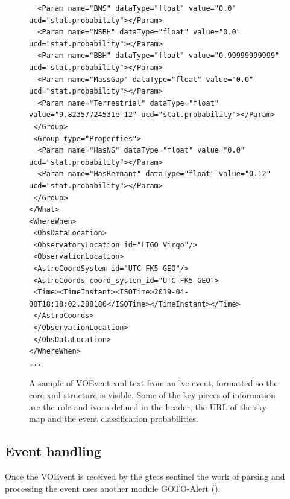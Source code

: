 \begin{colsection}
\begin{colsection}
\begin{figure}[p]
\begin{lstlisting}
  <Param name="BNS" dataType="float" value="0.0" ucd="stat.probability"></Param>
  <Param name="NSBH" dataType="float" value="0.0" ucd="stat.probability"></Param>
  <Param name="BBH" dataType="float" value="0.99999999999" ucd="stat.probability"></Param>
  <Param name="MassGap" dataType="float" value="0.0" ucd="stat.probability"></Param>
  <Param name="Terrestrial" dataType="float" value="9.82357724531e-12" ucd="stat.probability"></Param>
 </Group>
 <Group type="Properties">
  <Param name="HasNS" dataType="float" value="0.0" ucd="stat.probability"></Param>
  <Param name="HasRemnant" dataType="float" value="0.12" ucd="stat.probability"></Param>
 </Group>
</What>
<WhereWhen>
 <ObsDataLocation>
 <ObservatoryLocation id="LIGO Virgo"/>
 <ObservationLocation>
 <AstroCoordSystem id="UTC-FK5-GEO"/>
 <AstroCoords coord_system_id="UTC-FK5-GEO">
 <Time><TimeInstant><ISOTime>2019-04-08T18:18:02.288180</ISOTime></TimeInstant></Time>
 </AstroCoords>
 </ObservationLocation>
 </ObsDataLocation>
</WhereWhen>
...
\end{lstlisting}
\caption[VOEvent XML sample]{A sample of VOEvent \gls{xml} text from an \gls{lvc} event, formatted so the core \gls{xml} structure is visible. Some of the key pieces of information are the role and \gls{ivorn} defined in the header, the URL of the sky map and the event classification probabilities.
}
\label{fig:voevent_xml}
\end{figure}

\newpage

\end{colsection}


\subsection{Event handling}
\label{sec:event_handling}
\begin{colsection}

Once the VOEvent is received by the \gls{gtecs} sentinel the work of parsing and processing the event uses another  module GOTO-Alert ().


\end{colsection}
\end{colsection}
